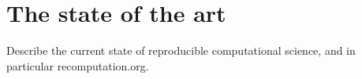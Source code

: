 \section{The state of the art}
\label{s:recomputation}

Describe the current state of reproducible computational science, and
in particular recomputation.org.
